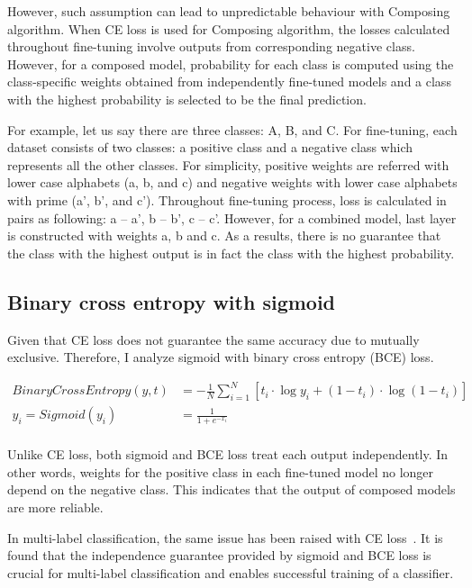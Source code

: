 \documentclass{article}
\begin{document}
However, such assumption can lead to unpredictable behaviour with Composing algorithm. When CE loss is used for Composing algorithm, the losses calculated throughout fine-tuning involve outputs from corresponding negative class. However, for a composed model, probability for each class is computed using the class-specific weights obtained from independently fine-tuned models and a class with the highest probability is selected to be the final prediction.

For example, let us say there are three classes: A, B, and C. For fine-tuning, each dataset consists of two classes: a positive class and a negative class which represents all the other classes. For simplicity, positive weights are referred with lower case alphabets (a, b, and c) and negative weights with lower case alphabets with prime (a', b', and c'). Throughout fine-tuning process, loss is calculated in pairs as following: a -- a', b -- b', c -- c'. However, for a combined model, last layer is constructed with weights a, b and c. As a results, there is no guarantee that the class with the highest output is in fact the class with the highest probability.

\subsection{Binary cross entropy with sigmoid}

Given that CE loss does not guarantee the same accuracy due to mutually exclusive. Therefore, I analyze sigmoid with binary cross entropy (BCE) loss.

\begin{align*}
BinaryCrossEntropy(y, t) & = -\frac{1}{N}\sum_{i=1}^N \left[ t_i \cdot \log y_i + (1 - t_i) \cdot \log (1 - t_i) \right] \\
y_i = Sigmoid(y_i) &= \frac{1}{1 + e^{-x_i}} \\
\end{align*}

Unlike CE loss, both sigmoid and BCE loss treat each output independently. In other words, weights for the positive class in each fine-tuned model no longer depend on the negative class. This indicates that the output of composed models are more reliable.

In multi-label classification, the same issue has been raised with CE loss~\cite{liu2017deep}. It is found that the independence guarantee provided by sigmoid and BCE loss is crucial for multi-label classification and enables successful training of a classifier.
\end{document}
